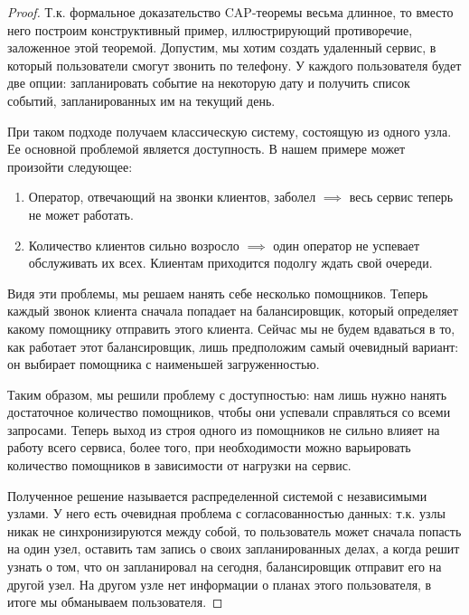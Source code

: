 \begin{proof}
  Т.к. формальное доказательство CAP-теоремы весьма длинное, то вместо него
  построим конструктивный пример, иллюстрирующий противоречие, заложенное этой
  теоремой. Допустим, мы хотим создать удаленный сервис, в который пользователи
  смогут звонить по телефону. У каждого пользователя будет две опции:
  запланировать событие на некоторую дату и получить список событий,
  запланированных им на текущий день.

  При таком подходе получаем классическую систему, состоящую из одного узла. Ее
  основной проблемой является доступность. В нашем примере может произойти
  следующее:

  \begin{enumerate}
  \item
    Оператор, отвечающий на звонки клиентов, заболел \(\implies\) весь сервис
    теперь не может работать.
  
  \item
    Количество клиентов сильно возросло \(\implies\) один оператор не успевает
    обслуживать их всех. Клиентам приходится подолгу ждать свой очереди.
  \end{enumerate}

  Видя эти проблемы, мы решаем нанять себе несколько помощников. Теперь каждый
  звонок клиента сначала попадает на балансировщик, который определяет какому
  помощнику отправить этого клиента. Сейчас мы не будем вдаваться в то, как
  работает этот балансировщик, лишь предположим самый очевидный вариант: он
  выбирает помощника с наименьшей загруженностью.
  
  Таким образом, мы решили проблему с доступностью: нам лишь нужно нанять
  достаточное количество помощников, чтобы они успевали справляться со всеми
  запросами. Теперь выход из строя одного из помощников не сильно влияет на
  работу всего сервиса, более того, при необходимости можно варьировать
  количество помощников в зависимости от нагрузки на сервис.

  Полученное решение называется распределенной системой с независимыми узлами. У
  него есть очевидная проблема с согласованностью данных: т.к. узлы никак не
  синхронизируются между собой, то пользователь может сначала попасть на один
  узел, оставить там запись о своих запланированных делах, а когда решит узнать
  о том, что он запланировал на сегодня, балансировщик отправит его на другой
  узел. На другом узле нет информации о планах этого пользователя, в итоге мы
  обманываем пользователя.


\end{proof}
